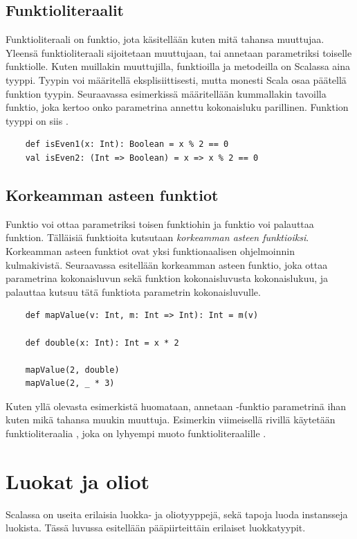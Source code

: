 \subsection{Funktioliteraalit}
Funktioliteraali on funktio, jota käsitellään kuten mitä tahansa muuttujaa. Yleensä funktioliteraali sijoitetaan muuttujaan, tai annetaan parametriksi toiselle funktiolle. Kuten muillakin muuttujilla, funktioilla ja metodeilla on Scalassa aina tyyppi. Tyypin voi määritellä eksplisiittisesti, mutta monesti Scala osaa päätellä funktion tyypin.
Seuraavassa esimerkissä määritellään kummallakin tavoilla funktio, joka kertoo onko parametrina annettu kokonaisluku parillinen. Funktion tyyppi on siis .
\cite[Luku 8]{prorgrammingInScala3rd}
\begin{lstlisting}
    def isEven1(x: Int): Boolean = x % 2 == 0
    val isEven2: (Int => Boolean) = x => x % 2 == 0
\end{lstlisting}

\subsection{Korkeamman asteen funktiot}
Funktio voi ottaa parametriksi toisen funktiohin ja funktio voi palauttaa funktion. Tälläisiä funktioita kutsutaan \textit{korkeamman asteen funktioiksi}. Korkeamman asteen funktiot ovat yksi funktionaalisen ohjelmoinnin kulmakivistä. Seuraavassa esitellään korkeamman asteen funktio, joka ottaa parametrina kokonaisluvun sekä funktion kokonaisluvusta kokonaislukuu, ja palauttaa kutsuu tätä funktiota parametrin kokonaisluvulle.
\begin{lstlisting}
    def mapValue(v: Int, m: Int => Int): Int = m(v)
    
    def double(x: Int): Int = x * 2
    
    mapValue(2, double)
    mapValue(2, _ * 3)
\end{lstlisting}
Kuten yllä olevasta esimerkistä huomataan, annetaan -funktio parametrinä ihan kuten mikä tahansa muukin muuttuja. Esimerkin viimeisellä rivillä käytetään funktioliteraalia , joka on lyhyempi muoto funktioliteraalille .
\cite[Luku 12]{scalaForTheImpatient}


\section{Luokat ja oliot} \label{LuokatJaOliot}
Scalassa on useita erilaisia luokka- ja oliotyyppejä, sekä tapoja luoda instansseja luokista. Tässä luvussa esitellään pääpiirteittäin erilaiset luokkatyypit.

